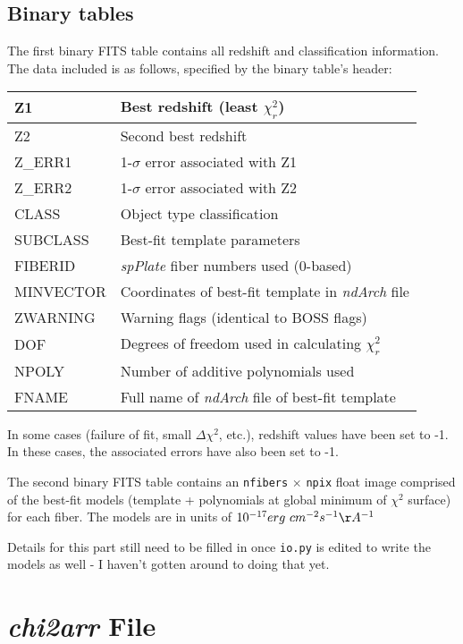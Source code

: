 \documentclass[12pt]{article}
\begin{document}
\subsection{Binary tables}

The first binary FITS table contains all redshift and classification information.
The data included is as follows, specified by the binary table's header:

\begin{center}
	\begin{tabular}{ | l | l | }
	\hline
	Z1 & Best redshift (least $\chi_r^2$) \\ \hline
	Z2 & Second best redshift \\ \hline
	Z\_ERR1 & 1-$\sigma$ error associated with Z1 \\ \hline
	Z\_ERR2 & 1-$\sigma$ error associated with Z2 \\ \hline
	CLASS & Object type classification \\ \hline
	SUBCLASS & Best-fit template parameters \\ \hline
	FIBERID & \textit{spPlate} fiber numbers used (0-based) \\ \hline
	MINVECTOR & Coordinates of best-fit template in \textit{ndArch} file \\ \hline
	ZWARNING & Warning flags (identical to BOSS flags) \\ \hline
	DOF & Degrees of freedom used in calculating $\chi_r^2$ \\ \hline
	NPOLY & Number of additive polynomials used \\ \hline
	FNAME & Full name of \textit{ndArch} file of best-fit template \\
	\hline
	\end{tabular}
\end{center}

In some cases (failure of fit, small $\Delta\chi^2$, etc.), redshift values have
been set to -1.  In these cases, the associated errors have also been set to -1.

The second binary FITS table contains an \texttt{nfibers} $\times$ \texttt{npix} float
image comprised of the best-fit models (template + polynomials at global
minimum of $\chi^2$ surface) for each fiber.  The models are in units of
$10^{-17} erg\ cm^{-2} s^{-1} \AA^{-1}$

Details for this part still need to be filled in once \texttt{io.py} is edited to write
the models as well - I haven't gotten around to doing that yet.

\section{\textit{chi2arr} File}
\end{document}
